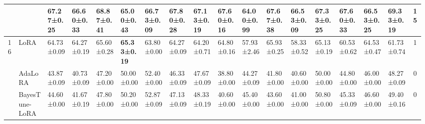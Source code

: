 \begin{table*}[]
\begin{scriptsize}
{\begin{tabular}{c|l|l|l|l|l|l|l|l|l|l|l|l|l|l|l|l|c}
                    & \method{}                                 & \textbf{67.27±0.25}              & \textbf{66.60±0.33}               & \textbf{68.87±0.41}              & \textbf{65.00±0.43}               & \textbf{66.73±0.09}              & \textbf{67.80±0.28}               & \textbf{67.13±0.19}              & \textbf{67.60±0.16}               & \textbf{64.00±0.99}               & \textbf{67.67±0.38}              & \textbf{66.53±0.09}              & \textbf{67.33±0.25}              & \textbf{67.60±0.33}               & \textbf{66.53±0.25}              & \textbf{69.33±0.19}              & \textbf{15}   \\ \hline
\multirow{5}{*}{16} & LoRA                                   & 64.73±0.09                       & 64.27±0.19                       & 65.60±0.28                        & \textbf{65.33±0.19}              & 63.80±0.00                        & 64.27±0.09                       & 64.20±0.71                        & 64.80±0.16                        & 57.93±2.46                       & 65.93±0.25                       & 58.33±0.52                       & 65.13±0.19                       & 60.53±0.62                       & 64.53±0.47                       & 61.73±0.74                       & 1             \\ %
                    & AdaLoRA                              & 43.87±0.09                       & 40.73±0.09                       & 47.20±0.00                        & 50.00±0.00                        & 52.40±0.00                        & 46.33±0.09                       & 47.67±0.09                       & 38.80±0.00                        & 44.27±0.09                       & 41.80±0.00                        & 40.60±0.00                        & 50.00±0.00                        & 44.80±0.00                        & 46.00±0.00                        & 48.27±0.09                       & 0             \\ %
                    & BayesTune-LoRA                            & 44.60±0.00                        & 41.67±0.19                       & 47.80±0.00                        & 50.20±0.00                        & 52.87±0.09                       & 47.13±0.09                       & 48.33±0.19                       & 40.60±0.00                        & 45.40±0.00                        & 43.60±0.00                        & 41.00±0.00                        & 50.80±0.00                        & 45.33±0.09                       & 46.60±0.00                        & 49.40±0.16                        & 0             \\ %

\end{tabular}}
\end{scriptsize}
\end{table*}

